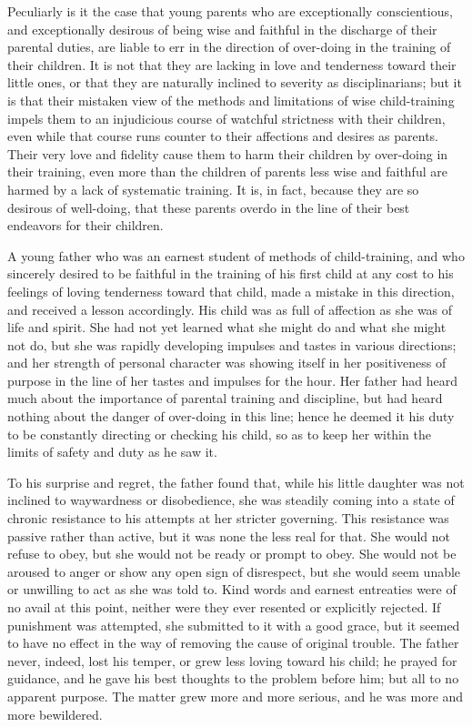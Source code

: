 \documentclass[
]{book}
\begin{document}
Peculiarly is it the case that young parents who are exceptionally conscientious, and exceptionally desirous of being wise and faithful in the discharge of their parental duties, are liable to err in the direction of over-doing in the training of their children. It is not that they are lacking in love and tenderness toward their little ones, or that they are naturally inclined to severity as disciplinarians; but it is that their mistaken view of the methods and limitations of wise child-training impels them to an injudicious course of watchful strictness with their children, even while that course runs counter to their affections and desires as parents. Their very love and fidelity cause them to harm their children by over-doing in their training, even more than the children of parents less wise and faithful are harmed by a lack of systematic training. It is, in fact, because they are so desirous of well-doing, that these parents overdo in the line of their best endeavors for their children.

A young father who was an earnest student of methods of child-training, and who sincerely desired to be faithful in the training of his first child at any cost to his feelings of loving tenderness toward that child, made a mistake in this direction, and received a lesson accordingly. His child was as full of affection as she was of life and spirit. She had not yet learned what she might do and what she might not do, but she was rapidly developing impulses and tastes in various directions; and her strength of personal character was showing itself in her positiveness of purpose in the line of her tastes and impulses for the hour. Her father had heard much about the importance of parental training and discipline, but had heard nothing about the danger of over-doing in this line; hence he deemed it his duty to be constantly directing or checking his child, so as to keep her within the limits of safety and duty as he saw it.

To his surprise and regret, the father found that, while his little daughter was not inclined to waywardness or disobedience, she was steadily coming into a state of chronic resistance to his attempts at her stricter governing. This resistance was passive rather than active, but it was none the less real for that. She would not refuse to obey, but she would not be ready or prompt to obey. She would not be aroused to anger or show any open sign of disrespect, but she would seem unable or unwilling to act as she was told to. Kind words and earnest entreaties were of no avail at this point, neither were they ever resented or explicitly rejected. If punishment was attempted, she submitted to it with a good grace, but it seemed to have no effect in the way of removing the cause of original trouble. The father never, indeed, lost his temper, or grew less loving toward his child; he prayed for guidance, and he gave his best thoughts to the problem before him; but all to no apparent purpose. The matter grew more and more serious, and he was more and more bewildered.
\end{document}
